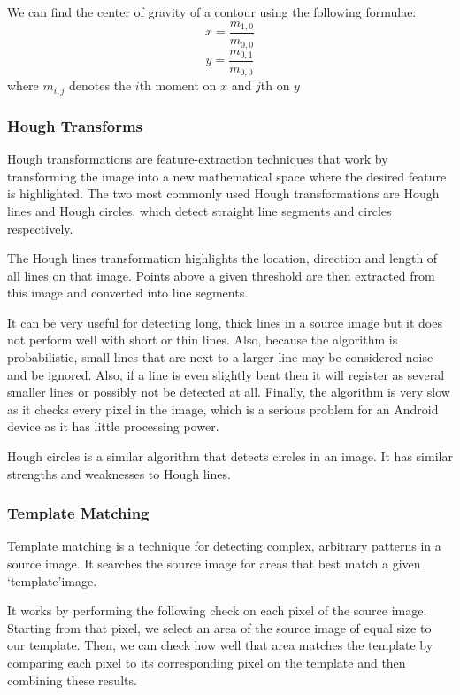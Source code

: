 We can find the center of gravity of a contour using the following formulae:
\begin{equation}
    x = \frac{ m_{1,0}}{m_{0,0}}
\end{equation}
\begin{equation}
    y = \frac{m_{0,1}}{m_{0,0}}
\end{equation}
where $m_{i,j}$ denotes the $i$th moment on $x$ and $j$th on $y$



\subsubsection{Hough Transforms} \label{sec:hough}

Hough transformations are feature-extraction techniques that work by transforming the image into a new mathematical space where the desired feature is highlighted. The two most commonly used Hough transformations are Hough lines and Hough circles, which detect straight line segments and circles respectively.

The Hough lines transformation highlights the location, direction and length of all lines on that image. Points above a given threshold are then extracted from this image and converted into line segments.

It can be very useful for detecting long, thick lines in a source image but it does not perform well with short or thin lines. Also, because the algorithm is probabilistic, small lines that are next to a larger line may be considered noise and be ignored. Also, if a line is even slightly bent then it will register as several smaller lines or possibly not be detected at all. Finally, the algorithm is very slow as it checks every pixel in the
image, which is a serious problem for an Android device as it has little processing power.

Hough circles is a similar algorithm that detects circles in an image. It has similar strengths and weaknesses to Hough lines.

\subsubsection{Template Matching} \label{sec:template}

Template matching is a technique for detecting complex, arbitrary patterns in a source image. It searches the source image for areas that best match a given \lq template\rq  image.

It works by performing the following check on each pixel of the source image. Starting from that pixel, we select an area of the source image of equal size to our template. Then, we can check how well that area matches the template by comparing each pixel to its corresponding pixel on the template and then combining these results. 

